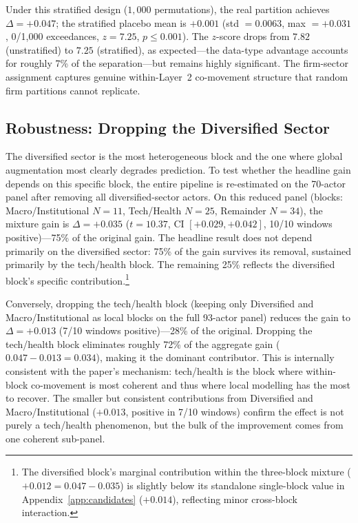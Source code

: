 \documentclass[11pt,a4paper]{article}
\begin{document}
Under this stratified design ($1{,}000$ permutations), the real partition achieves $\Delta = +0.047$; the stratified placebo mean is $+0.001$ (std $= 0.0063$, max $= +0.031$, 0/1{,}000 exceedances, $z = 7.25$, $p \leq 0.001$). The $z$-score drops from $7.82$ (unstratified) to $7.25$ (stratified), as expected---the data-type advantage accounts for roughly 7\% of the separation---but remains highly significant. The firm-sector assignment captures genuine within-Layer~2 co-movement structure that random firm partitions cannot replicate.

\subsection{Robustness: Dropping the Diversified Sector}

The diversified sector is the most heterogeneous block and the one where global augmentation most clearly degrades prediction. To test whether the headline gain depends on this specific block, the entire pipeline is re-estimated on the 70-actor panel after removing all diversified-sector actors. On this reduced panel (blocks: Macro/Institutional $N{=}11$, Tech/Health $N{=}25$, Remainder $N{=}34$), the mixture gain is $\Delta = +0.035$ ($t = 10.37$, CI $[+0.029, +0.042]$, 10/10 windows positive)---75\% of the original gain. The headline result does not depend primarily on the diversified sector: 75\% of the gain survives its removal, sustained primarily by the tech/health block. The remaining 25\% reflects the diversified block's specific contribution.\footnote{The diversified block's marginal contribution within the three-block mixture ($+0.012 = 0.047 - 0.035$) is slightly below its standalone single-block value in Appendix~\ref{app:candidates} ($+0.014$), reflecting minor cross-block interaction.}

Conversely, dropping the tech/health block (keeping only Diversified and Macro/Institutional as local blocks on the full 93-actor panel) reduces the gain to $\Delta = +0.013$ (7/10 windows positive)---28\% of the original. Dropping the tech/health block eliminates roughly 72\% of the aggregate gain ($0.047 - 0.013 = 0.034$), making it the dominant contributor. This is internally consistent with the paper's mechanism: tech/health is the block where within-block co-movement is most coherent and thus where local modelling has the most to recover. The smaller but consistent contributions from Diversified and Macro/Institutional ($+0.013$, positive in 7/10 windows) confirm the effect is not purely a tech/health phenomenon, but the bulk of the improvement comes from one coherent sub-panel.
\end{document}
